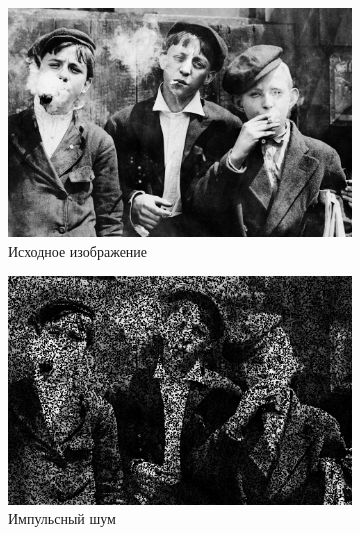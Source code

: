 \begin{figure}[ht] 
    \centering
    \begin{subfigure}[b]{0.5\linewidth}
        \centering
        \includegraphics[width=0.95\linewidth]{../lewis-hine-taschen-main-3.jpg} 
        \caption{Исходное изображение} 
        \label{contraharmonic_-1.85:a} 
        \vspace{4ex}
    \end{subfigure}%
    \begin{subfigure}[b]{0.5\linewidth}
      \centering
      \includegraphics[width=0.95\linewidth]{../Contraharmonic_Filter/Contraharmonic_Impulse_noise_(m,n=(3,_3),q=-1.85).jpg} 
      \caption{Импульсный шум} 
      \label{contraharmonic_-1.85:b} 
      \vspace{4ex}
    \end{subfigure}
    \begin{subfigure}[b]{0.5\linewidth}
      \centering

\end{subfigure}
\end{figure}
